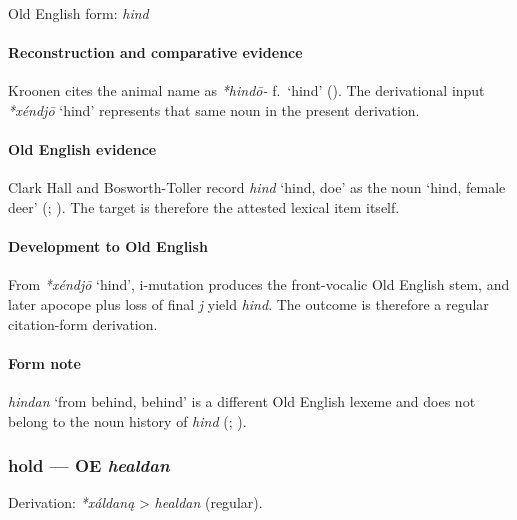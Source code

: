 \documentclass[
  british,
  a4paper,
]{article}
\providecommand{\Recon}[1]{\emph{*#1}}
\begin{document}
Old English form: \emph{hind}

\paragraph{Reconstruction and comparative
evidence}\label{reconstruction-and-comparative-evidence-33}

Kroonen cites the animal name as \emph{*hindō-} f.~`hind'
(). The derivational input
\Recon{xéndjō} `hind' represents that same noun in the present
derivation.

\paragraph{Old English evidence}\label{old-english-evidence-33}

Clark Hall and Bosworth-Toller record {\emph{hind}} `hind, doe' as the
noun `hind, female deer' (;
). The
target is therefore the attested lexical item itself.

\paragraph{Development to Old
English}\label{development-to-old-english-33}

From \Recon{xéndjō} `hind', i-mutation produces the front-vocalic Old
English stem, and later apocope plus loss of final \emph{j} yield
\emph{hind}. The outcome is therefore a regular citation-form
derivation.

\paragraph{Form note}\label{form-note-9}

\emph{hindan} `from behind, behind' is a different Old English lexeme
and does not belong to the noun history of \emph{hind}
(;
).

\subsubsection{\texorpdfstring{hold --- OE
\emph{healdan}}{hold --- OE healdan}}\label{hold-oe-healdan}

Derivation: \emph{*xáldaną} \textgreater{} \emph{healdan} (regular).
\end{document}
